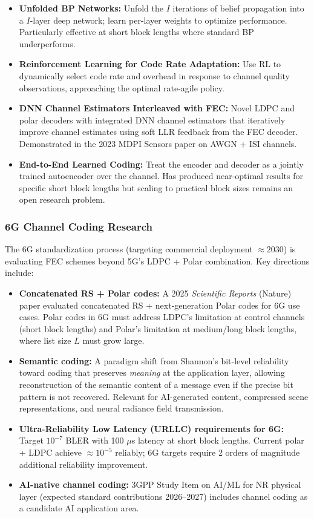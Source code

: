 \documentclass[11pt,letterpaper]{article}
\begin{document}
\begin{itemize}[leftmargin=*]
  \item \textbf{Unfolded BP Networks:} Unfold the $I$ iterations of belief propagation into a $I$-layer deep network; learn per-layer weights to optimize performance. Particularly effective at short block lengths where standard BP underperforms.
  \item \textbf{Reinforcement Learning for Code Rate Adaptation:} Use RL to dynamically select code rate and overhead in response to channel quality observations, approaching the optimal rate-agile policy.
  \item \textbf{DNN Channel Estimators Interleaved with FEC:} Novel LDPC and polar decoders with integrated DNN channel estimators that iteratively improve channel estimates using soft LLR feedback from the FEC decoder. Demonstrated in the 2023 MDPI Sensors paper on AWGN + ISI channels.
  \item \textbf{End-to-End Learned Coding:} Treat the encoder and decoder as a jointly trained autoencoder over the channel. Has produced near-optimal results for specific short block lengths but scaling to practical block sizes remains an open research problem.
\end{itemize}

\subsubsection{6G Channel Coding Research}

The 6G standardization process (targeting commercial deployment $\approx 2030$) is evaluating FEC schemes beyond 5G's LDPC + Polar combination. Key directions include:

\begin{itemize}[leftmargin=*]
  \item \textbf{Concatenated RS + Polar codes:} A 2025 \textit{Scientific Reports} (Nature) paper evaluated concatenated RS + next-generation Polar codes for 6G use cases. Polar codes in 6G must address LDPC's limitation at control channels (short block lengths) and Polar's limitation at medium/long block lengths, where list size $L$ must grow large.
  \item \textbf{Semantic coding:} A paradigm shift from Shannon's bit-level reliability toward coding that preserves \textit{meaning} at the application layer, allowing reconstruction of the semantic content of a message even if the precise bit pattern is not recovered. Relevant for AI-generated content, compressed scene representations, and neural radiance field transmission.
  \item \textbf{Ultra-Reliability Low Latency (URLLC) requirements for 6G:} Target $10^{-7}$ BLER with 100 $\mu$s latency at short block lengths. Current polar + LDPC achieve $\approx 10^{-5}$ reliably; 6G targets require 2 orders of magnitude additional reliability improvement.
  \item \textbf{AI-native channel coding:} 3GPP Study Item on AI/ML for NR physical layer (expected standard contributions 2026--2027) includes channel coding as a candidate AI application area.
\end{itemize}
\end{document}
